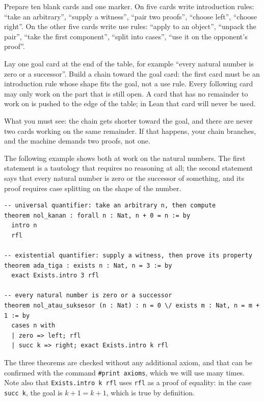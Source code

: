 \begin{tangan}
Prepare ten blank cards and one marker. On five cards write introduction rules: ``take an
arbitrary'', ``supply a witness'', ``pair two proofs'', ``choose left'', ``choose right''. On the
other five cards write use rules: ``apply to an object'', ``unpack the pair'', ``take the first
component'', ``split into cases'', ``use it on the opponent's proof''.

Lay one goal card at the end of the table, for example ``every natural number is zero or a
successor''. Build a chain toward the goal card: the first card must be an introduction rule whose
shape fits the goal, not a use rule. Every following card may only work on the part that is still
open. A card that has no remainder to work on is pushed to the edge of the table; in Lean that card
will never be used.

What you must see: the chain gets shorter toward the goal, and there are never two cards working on
the same remainder. If that happens, your chain branches, and the machine demands two proofs, not
one.
\end{tangan}

The following example shows both at work on the natural numbers. The first statement is a tautology
that requires no reasoning at all; the second statement says that every natural number is zero or
the successor of something, and its proof requires case splitting on the shape of the number.

\begin{verbatim}
-- universal quantifier: take an arbitrary n, then compute
theorem nol_kanan : forall n : Nat, n + 0 = n := by
  intro n
  rfl

-- existential quantifier: supply a witness, then prove its property
theorem ada_tiga : exists n : Nat, n = 3 := by
  exact Exists.intro 3 rfl

-- every natural number is zero or a successor
theorem nol_atau_suksesor (n : Nat) : n = 0 \/ exists m : Nat, n = m + 1 := by
  cases n with
  | zero => left; rfl
  | succ k => right; exact Exists.intro k rfl
\end{verbatim}

The three theorems are checked without any additional axiom, and that can be confirmed with the
command \texttt{\#print axioms}, which we will use many times. Note also that
\texttt{Exists.intro k rfl} uses \texttt{rfl} as a proof of equality: in the case
\texttt{succ k}, the goal is $k+1=k+1$, which is true by definition.

